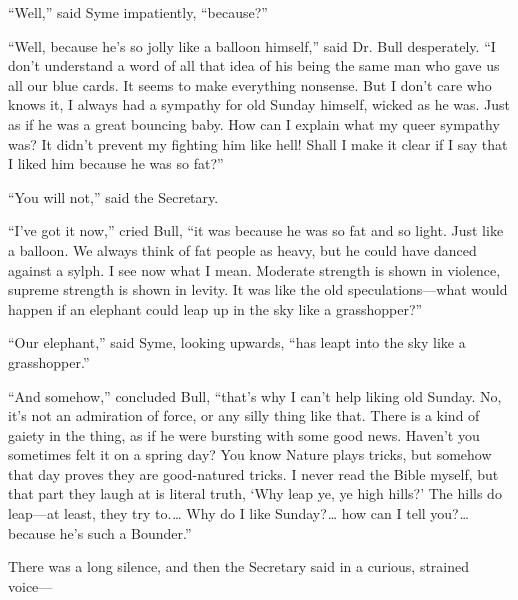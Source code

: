 “Well,” said Syme impatiently, “because?”

“Well, because he’s so jolly like a balloon himself,” said Dr. Bull desperately. “I don’t understand a word of all that idea of his being the same man who gave us all our blue cards. It seems to make everything nonsense. But I don’t care who knows it, I always had a sympathy for old Sunday himself, wicked as he was. Just as if he was a great bouncing baby. How can I explain what my queer sympathy was? It didn’t prevent my fighting him like hell! Shall I make it clear if I say that I liked him because he was so fat?”

“You will not,” said the Secretary.

“I’ve got it now,” cried Bull, “it was because he was so fat and so light. Just like a balloon. We always think of fat people as heavy, but he could have danced against a sylph. I see now what I mean. Moderate strength is shown in violence, supreme strength is shown in levity. It was like the old speculations⁠—what would happen if an elephant could leap up in the sky like a grasshopper?”

“Our elephant,” said Syme, looking upwards, “has leapt into the sky like a grasshopper.”

“And somehow,” concluded Bull, “that’s why I can’t help liking old Sunday. No, it’s not an admiration of force, or any silly thing like that. There is a kind of gaiety in the thing, as if he were bursting with some good news. Haven’t you sometimes felt it on a spring day? You know Nature plays tricks, but somehow that day proves they are good-natured tricks. I never read the Bible myself, but that part they laugh at is literal truth, ‘Why leap ye, ye high hills?’ The hills do leap⁠—at least, they try to.⁠ ⁠… Why do I like Sunday?⁠ ⁠… how can I tell you?⁠ ⁠… because he’s such a Bounder.”

There was a long silence, and then the Secretary said in a curious, strained voice⁠—

